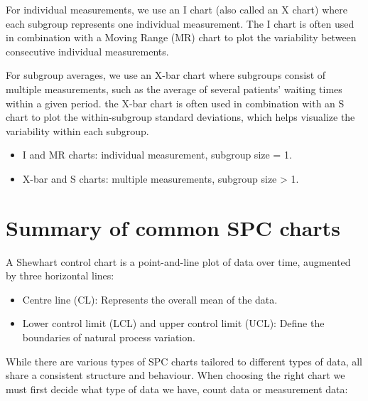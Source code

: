 \documentclass[
]{book}
\providecommand{\tightlist}{%
  \setlength{\itemsep}{0pt}\setlength{\parskip}{0pt}}
\begin{document}
For individual measurements, we use an I chart (also called an X chart) where each subgroup represents one individual measurement. The I chart is often used in combination with a Moving Range (MR) chart to plot the variability between consecutive individual measurements.

For subgroup averages, we use an X-bar chart where subgroups consist of multiple measurements, such as the average of several patients' waiting times within a given period. the X-bar chart is often used in combination with an S chart to plot the within-subgroup standard deviations, which helps visualize the variability within each subgroup.

\begin{itemize}
\tightlist
\item
  I and MR charts: individual measurement, subgroup size = 1.
\item
  X-bar and S charts: multiple measurements, subgroup size \textgreater{} 1.
\end{itemize}

\section{Summary of common SPC charts}\label{summary-of-common-spc-charts}

A Shewhart control chart is a point-and-line plot of data over time, augmented by three horizontal lines:

\begin{itemize}
\tightlist
\item
  Centre line (CL): Represents the overall mean of the data.
\item
  Lower control limit (LCL) and upper control limit (UCL): Define the boundaries of natural process variation.
\end{itemize}

While there are various types of SPC charts tailored to different types of data, all share a consistent structure and behaviour. When choosing the right chart we must first decide what type of data we have, count data or measurement data:
\end{document}
